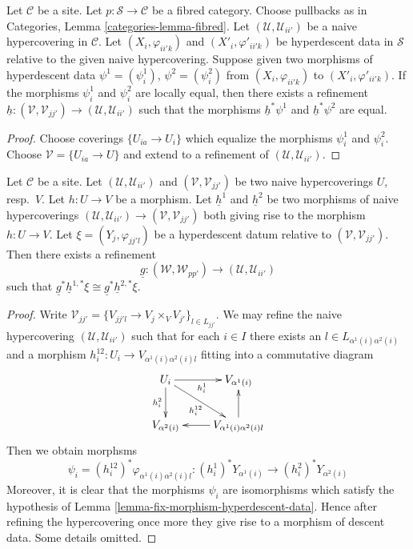 \begin{lemma}
\label{lemma-equalize-maps}
Let $\mathcal{C}$ be a site.
Let $p : \mathcal{S} \to \mathcal{C}$ be a fibred category.
Choose pullbacks as in Categories, Lemma \ref{categories-lemma-fibred}.
Let
$(\mathcal{U}, \mathcal{U}_{ii'})$
be a naive hypercovering in $\mathcal{C}$.
Let $(X_i, \varphi_{ii'k})$ and $(X'_i, \varphi'_{ii'k})$
be hyperdescent data in $\mathcal{S}$
relative to the given naive hypercovering.
Suppose given two morphisms of hyperdescent data
$\psi^1 = (\psi^1_i)$, $\psi^2 = (\psi^2_i)$ from $(X_i, \varphi_{ii'k})$
to $(X'_i, \varphi'_{ii'k})$. If the morphisms $\psi^1_i$
and $\psi^2_i$ are locally equal, then
there exists a refinement
$\underline{h} :
(\mathcal{V}, \mathcal{V}_{jj'}) \to (\mathcal{U}, \mathcal{U}_{ii'})$
such that the morphisms $\underline{h}^*\psi^1$ and $\underline{h}^*\psi^2$
are equal.
\end{lemma}

\begin{proof}
Choose coverings $\{U_{ia} \to U_i\}$ which equalize the morphisms
$\psi^1_i$ and $\psi^2_i$. Choose $\mathcal{V} = \{U_{ia} \to U\}$
and extend to a refinement of $(\mathcal{U}, \mathcal{U}_{ii'})$.
\end{proof}

\begin{lemma}
\label{lemma-equalize-objects}
Let $\mathcal{C}$ be a site.
Let $(\mathcal{U}, \mathcal{U}_{ii'})$ and $(\mathcal{V}, \mathcal{V}_{jj'})$
be two naive hypercoverings $U$, resp.\ $V$.
Let $h : U \to V$ be a morphism. Let
$\underline{h}^1$ and $\underline{h}^2$
be two morphisms of naive hypercoverings
$(\mathcal{U}, \mathcal{U}_{ii'}) \to (\mathcal{V}, \mathcal{V}_{jj'})$
both giving rise to the morphism $h : U \to V$.
Let $\xi = (Y_j, \varphi_{jj'l})$ be a hyperdescent datum relative
to $(\mathcal{V}, \mathcal{V}_{jj'})$.
Then there exists a refinement
$$
\underline{g} :
(\mathcal{W}, \mathcal{W}_{pp'})
\longrightarrow
(\mathcal{U}, \mathcal{U}_{ii'})
$$
such that
$
\underline{g}^*\underline{h}^{1, *}\xi \cong
\underline{g}^*\underline{h}^{2, *}\xi$.
\end{lemma}

\begin{proof}
Write
$\mathcal{V}_{jj'} = \{V_{jj'l} \to V_j \times_V V_{j'}\}_{l \in L_{jj'}}$.
We may refine the naive hypercovering
$(\mathcal{U}, \mathcal{U}_{ii'})$
such that for each $i \in I$ there exists an
$l \in L_{\alpha^1(i)\alpha^2(i)}$ and a morphism
$h^{12}_i : U_i \to V_{\alpha^1(i)\alpha^2(i)l}$
fitting into a commutative diagram
$$
\xymatrix{
U_i \ar[r]_{h^1_i} \ar[d]_{h^2_i} \ar[rd]_{h^{12}_i} & V_{\alpha^1(i)} \\
V_{\alpha^2(i)} & V_{\alpha^1(i)\alpha^2(i)l} \ar[l] \ar[u]
}
$$
Then we obtain morphsms
$$
\psi_i = (h^{12}_i)^*\varphi_{\alpha^1(i)\alpha^2(i)l} :
(h^1_i)^*Y_{\alpha^1(i)}
\longrightarrow
(h^2_i)^*Y_{\alpha^2(i)}
$$
Moreover, it is clear that the morphisms $\psi_i$ are isomorphisms
which satisfy the hypothesis of
Lemma \ref{lemma-fix-morphism-hyperdescent-data}. Hence after refining
the hypercovering once more they give rise to a morphism of descent
data. Some details omitted.
\end{proof}

